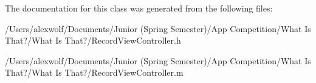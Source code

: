 The documentation for this class was generated from the following files\-:\begin{DoxyCompactItemize}
\item 
/\-Users/alexwolf/\-Documents/\-Junior (\-Spring Semester)/\-App Competition/\-What Is That?/\-What Is That?/Record\-View\-Controller.\-h\item 
/\-Users/alexwolf/\-Documents/\-Junior (\-Spring Semester)/\-App Competition/\-What Is That?/\-What Is That?/Record\-View\-Controller.\-m\end{DoxyCompactItemize}
